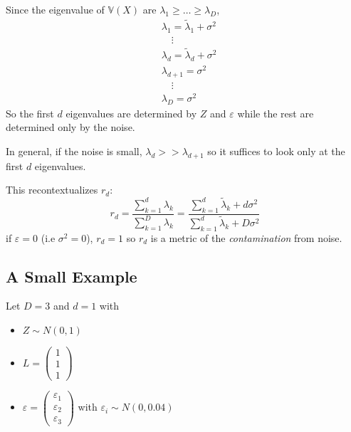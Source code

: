 \documentclass[12pt]{article}
\begin{document}
        Since the eigenvalue of $\mathbb{V}(X)$ are $\lambda_1 \geq \dots \geq \lambda_D$, 
        \begin{align*}
            &\lambda_1 = \tilde{\lambda}_1 + \sigma^2\\
                &\quad \vdots\\ 
            &\lambda_d = \tilde{\lambda}_d + \sigma^2\\
            &\lambda_{d+1} = \sigma^2\\ 
                &\quad \vdots\\ 
            &\lambda_D = \sigma^2
        \end{align*}
        So the first $d$ eigenvalues are determined by $Z$ and $\varepsilon$ while the rest are determined only by the noise. 

        In general, if the noise is small, $\lambda_d >> \lambda_{d+1}$ so it suffices to look only at the first $d$ eigenvalues. 

        This recontextualizes $r_d$: 
        \[r_d = \frac{\sum_{k=1}^d \lambda_k}{\sum_{k=1}^D \lambda_k} = \frac{\sum_{k=1}^d \tilde{\lambda}_k + d\sigma^2}{\sum_{k=1}^d \tilde{\lambda}_k + D\sigma^2}\]
        if $\varepsilon = 0$ (i.e $\sigma^2 = 0$), $r_d = 1$ so $r_d$ is a metric of the \emph{contamination} from noise. 

    \subsection{A Small Example}
        Let $D = 3$ and $d= 1$ with  
        \begin{itemize}
            \item $Z \sim N(0, 1)$
            \item $L = \begin{pmatrix}
                1\\1\\1
            \end{pmatrix}$
            \item $\varepsilon = \begin{pmatrix}
                \varepsilon_1\\
                \varepsilon_2\\
                \varepsilon_3  
            \end{pmatrix}$ with $\varepsilon_i \sim N(0, 0.04)$
        \end{itemize} 
\end{document}

